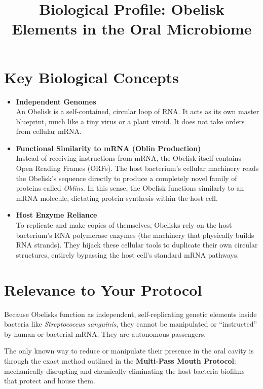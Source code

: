 \documentclass[11pt,a4paper]{article}
\title{Biological Profile: Obelisk Elements in the Oral Microbiome}
\author{}
\date{}
\begin{document}
\maketitle

\section*{Key Biological Concepts}

\begin{itemize}[leftmargin=*, itemsep=0.8em]
    \item \textbf{Independent Genomes} \\
    An Obelisk is a self-contained, circular loop of RNA. It acts as its own master blueprint, much like a tiny virus or a plant viroid. It does not take orders from cellular mRNA.

    \item \textbf{Functional Similarity to mRNA (Oblin Production)} \\
    Instead of receiving instructions from mRNA, the Obelisk itself contains Open Reading Frames (ORFs). The host bacterium's cellular machinery reads the Obelisk's sequence directly to produce a completely novel family of proteins called \textit{Oblins}. In this sense, the Obelisk functions similarly to an mRNA molecule, dictating protein synthesis within the host cell.

    \item \textbf{Host Enzyme Reliance} \\
    To replicate and make copies of themselves, Obelisks rely on the host bacterium's RNA polymerase enzymes (the machinery that physically builds RNA strands). They hijack these cellular tools to duplicate their own circular structures, entirely bypassing the host cell's standard mRNA pathways.
\end{itemize}

\section*{Relevance to Your Protocol}
Because Obelisks function as independent, self-replicating genetic elements inside bacteria like \textit{Streptococcus sanguinis}, they cannot be manipulated or ``instructed'' by human or bacterial mRNA. They are autonomous passengers. 

The only known way to reduce or manipulate their presence in the oral cavity is through the exact method outlined in the \textbf{Multi-Pass Mouth Protocol}: mechanically disrupting and chemically eliminating the host bacteria biofilms that protect and house them.
\end{document}
